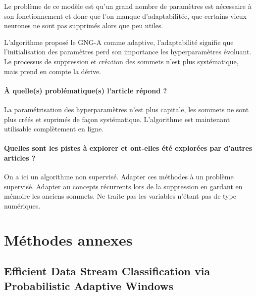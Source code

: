 \documentclass[11pt,a4paper]{report}
\begin{document}
Le problème de ce modèle est qu'un grand nombre de paramètres est nécessaire à son fonctionnement et donc que l'on manque d'adaptabilitée, que certains vieux neurones ne sont pas supprimés alors que peu utiles.

L'algorithme proposé le GNG-A comme adaptive, l'adaptabilité signifie que l'initialisation des paramètres perd son importance les hyperparamètres évoluant. Le processus de suppression et création des sommets n'est plus systématique, mais prend en compte la dérive. 

\paragraph{À quelle(s) problématique(s) l'article répond ? } La paramétrisation des hyperparamètres n'est plus capitale, les sommets ne sont plus créés et suprimés de façon systématique. L'algorithme est maintenant utilisable complètement en ligne.

\paragraph{Quelles sont les pistes à explorer et ont-elles  été explorées par d'autres articles ? } On a ici un algorithme non supervisé. Adapter ces méthodes à un problème supervisé. Adapter au concepts récurrents lors de la suppression en gardant en mémoire les anciens sommets. Ne traite pas les variables n'étant pas de type numériques.


















\newpage


















\section{Méthodes annexes}

\subsection{Efficient Data Stream Classification via Probabilistic Adaptive Windows}
\end{document}
